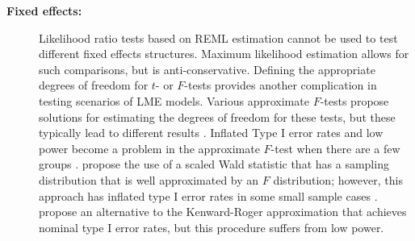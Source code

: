 \documentclass[12pt]{article}
\begin{document}
\begin{description}
\item[\bf Fixed effects: ] Likelihood ratio tests based on REML estimation cannot be used to test different fixed effects structures. Maximum likelihood estimation allows for such comparisons, but is anti-conservative. 
Defining the appropriate degrees of freedom for  $t$- or $F$-tests provides another  complication in testing scenarios of LME models. Various approximate $F$-tests propose solutions for estimating the degrees of freedom for these tests, but these typically lead to different results  \citep{Verbeke:2000fh}. Inflated Type I error rates and low power  become a problem  in the  approximate $F$-test when there are a few groups \citep{Catellier:2000vr}. \cite{Kenward:1997ft} propose the use of a scaled Wald statistic  that has a sampling distribution that is well approximated by an $F$ distribution; however, this approach has inflated type I error rates in some small sample cases  \citep{Gomez:2005dw}. \cite{Skene:2010kf} propose an alternative to the Kenward-Roger approximation that achieves nominal type I error rates, but this procedure suffers from low power. 
%
%
%



\end{description}
\end{document}

